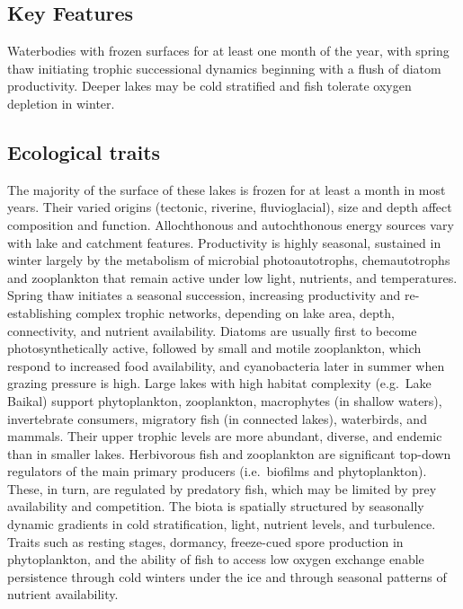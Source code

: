 \documentclass[
  letterpaper,
  DIV=11,
  numbers=noendperiod]{scrartcl}
\begin{document}
\subsection{Key Features}\label{key-features-11}

Waterbodies with frozen surfaces for at least one month of the year,
with spring thaw initiating trophic successional dynamics beginning with
a flush of diatom productivity. Deeper lakes may be cold stratified and
fish tolerate oxygen depletion in winter.

\subsection{Ecological traits}\label{ecological-traits-11}

The majority of the surface of these lakes is frozen for at least a
month in most years. Their varied origins (tectonic, riverine,
fluvioglacial), size and depth affect composition and function.
Allochthonous and autochthonous energy sources vary with lake and
catchment features. Productivity is highly seasonal, sustained in winter
largely by the metabolism of microbial photoautotrophs, chemautotrophs
and zooplankton that remain active under low light, nutrients, and
temperatures. Spring thaw initiates a seasonal succession, increasing
productivity and re-establishing complex trophic networks, depending on
lake area, depth, connectivity, and nutrient availability. Diatoms are
usually first to become photosynthetically active, followed by small and
motile zooplankton, which respond to increased food availability, and
cyanobacteria later in summer when grazing pressure is high. Large lakes
with high habitat complexity (e.g.~Lake Baikal) support phytoplankton,
zooplankton, macrophytes (in shallow waters), invertebrate consumers,
migratory fish (in connected lakes), waterbirds, and mammals. Their
upper trophic levels are more abundant, diverse, and endemic than in
smaller lakes. Herbivorous fish and zooplankton are significant top-down
regulators of the main primary producers (i.e.~biofilms and
phytoplankton). These, in turn, are regulated by predatory fish, which
may be limited by prey availability and competition. The biota is
spatially structured by seasonally dynamic gradients in cold
stratification, light, nutrient levels, and turbulence. Traits such as
resting stages, dormancy, freeze-cued spore production in phytoplankton,
and the ability of fish to access low oxygen exchange enable persistence
through cold winters under the ice and through seasonal patterns of
nutrient availability.
\end{document}

